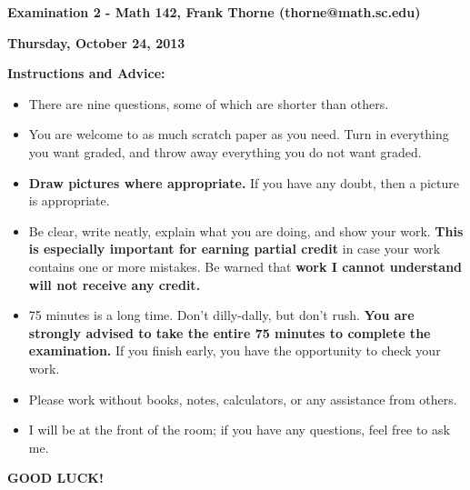 \documentclass[12pt]{article}
\begin{document}
\setlength{\topmargin}{-2mm}





\begin{center}{\bf Examination 2 - Math 142, Frank Thorne (thorne@math.sc.edu)}
\end{center}
\begin{center}
{\bf Thursday, October 24, 2013}
\end{center}

{\bf Instructions and Advice:} 

\begin{itemize}
\item
There are nine questions, some of which are shorter than others.
\item
You are welcome to as much scratch paper as you need. Turn in everything you want graded,
and throw away everything you do not want graded.
\item
{\bf Draw pictures where appropriate.} If you have any doubt, then a picture is appropriate.
\item
Be clear, write neatly, explain what you are doing, and show your work. {\bf This is especially
important for earning partial credit} in case your work contains one or more mistakes.
Be warned that {\bf work I cannot understand will not receive any credit.}
\item
75 minutes is a long time. Don't dilly-dally, but don't rush. {\bf You are strongly advised
to take the entire 75 minutes to complete the examination.} If you finish early, you have the
opportunity to check your work.
\item
Please work without books, notes, calculators, or any assistance from others. 
\item
I will be at the front of the room; if you have
any questions, feel free to ask me. 
\end{itemize}

\begin{center}
{\bf GOOD LUCK!}
\end{center}
\newpage
\end{document}
